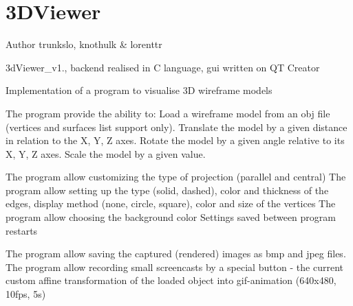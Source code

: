 \chapter{3DViewer}
\hypertarget{index}{}\label{index}
\begin{DoxyAuthor}{Author}
trunkslo, knothulk \& lorenttr
\end{DoxyAuthor}
3d\+Viewer\+\_\+v1., backend realised in C language, gui written on QT Creator

Implementation of a program to visualise 3D wireframe models

The program provide the ability to\+: Load a wireframe model from an obj file (vertices and surfaces list support only). Translate the model by a given distance in relation to the X, Y, Z axes. Rotate the model by a given angle relative to its X, Y, Z axes. Scale the model by a given value.

The program allow customizing the type of projection (parallel and central) The program allow setting up the type (solid, dashed), color and thickness of the edges, display method (none, circle, square), color and size of the vertices The program allow choosing the background color Settings saved between program restarts

The program allow saving the captured (rendered) images as bmp and jpeg files. The program allow recording small screencasts by a special button -\/ the current custom affine transformation of the loaded object into gif-\/animation (640x480, 10fps, 5s) 